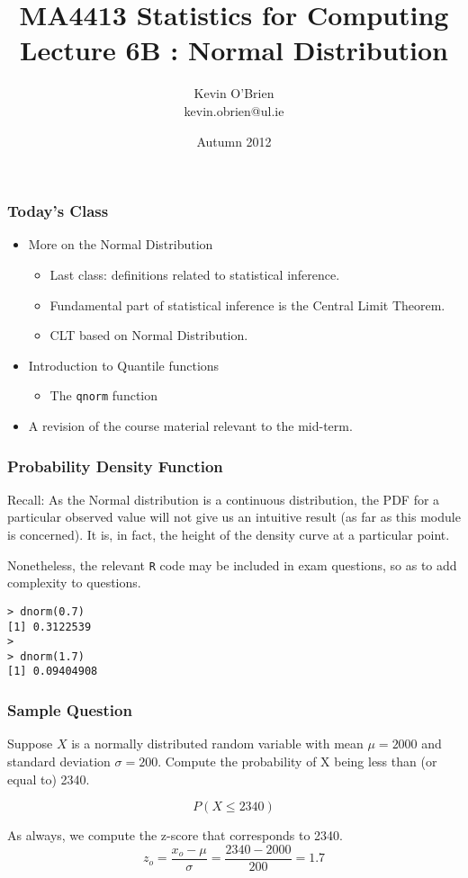 \documentclass[a4]{beamer}
\title[MA4413]{MA4413 Statistics for Computing \\ {\normalsize Lecture 6B : Normal Distribution}}
\author[Kevin O'Brien]{Kevin O'Brien \\ {\scriptsize kevin.obrien@ul.ie}}
\date{Autumn 2012}
\institute[Maths \& Stats]{Dept. of Mathematics \& Statistics, \\ University \textit{of} Limerick}
\begin{document}
\begin{frame}
\titlepage
\end{frame}


\begin{frame}[fragile]
\frametitle{Today's Class}
\begin{itemize}
\item More on the Normal Distribution
\begin{itemize}
\item Last class: definitions related to statistical inference.
\item Fundamental part of statistical inference is the Central Limit Theorem.
\item CLT based on Normal Distribution.
\end{itemize}
\item Introduction to Quantile functions
\begin{itemize}
\item The \texttt{qnorm} function
\end{itemize}
\item A revision of the course material relevant to the mid-term.
\end{itemize}
\end{frame}


\begin{frame}[fragile]
\frametitle{Probability Density Function}
Recall: As the Normal distribution is a continuous distribution, the PDF for a particular observed value will not give us an intuitive
result (as far as this module is concerned). It is, in fact, the height of the density curve at a particular point.

Nonetheless, the relevant \texttt{R} code may be included in exam questions, so as to add complexity to questions.

\begin{verbatim}
> dnorm(0.7)
[1] 0.3122539
>
> dnorm(1.7)
[1] 0.09404908

\end{verbatim}
\end{frame}
\begin{frame}[fragile]
\frametitle{Sample Question}
Suppose $X$ is a normally distributed random variable with mean $\mu = 2000$ and standard deviation $\sigma=200$.
Compute the probability of X being less than (or equal to) 2340.

\[P(X \leq 2340)\]

As always, we compute the z-score that corresponds to 2340.
\[ z_o = \frac{x_o - \mu}{\sigma}  = \frac{2340-2000}{200} = 1.7\]
\end{frame}
\end{document}
